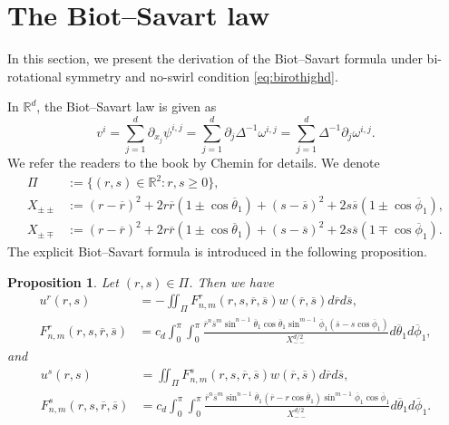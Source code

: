 \documentclass[11pt]{amsart}
\newtheorem{prop}[theorem]{Proposition}
\theoremstyle{definition}
\theoremstyle{remark}
\numberwithin{equation}{section}
\numberwithin{equation}{section}
\newcommand{\br}[1]{\overline{#1}}
\newcommand{\lap}{\Delta}
\newcommand{\rd}{\partial}
\newcommand{\0}{\emptyset}
\newcommand{\tht}{\theta}
\newcommand{\omg}{\omega}
\newcommand{\bbR}{\mathbb R}
\begin{document}
	
\section{The Biot--Savart law}\label{sec:BSlaw}
	
In this section, we present the derivation of the Biot--Savart formula under bi-rotational symmetry and no-swirl condition \eqref{eq:birothighd}. %
	
In $\bbR^{d}$, the Biot--Savart law is given as
\begin{equation}\label{eq:BSlawCartesian}
	v^{i}=\sum_{j=1}^{d}\rd_{x_{j}}\psi^{i,j}=\sum_{j=1}^{d}\rd_{j}\lap^{-1}\omg^{i,j}=\sum_{j=1}^{d}\lap^{-1}\rd_{j}\omg^{i,j}.
\end{equation}
We refer the readers to the book by Chemin \cite{Chemin} for details. We denote
\begin{equation}
\begin{aligned}
\Pi&:=\{(r,s)\in \bbR^{2} : r,s\geq0\},\\
X_{\pm\pm}&:=(r-\br{r})^{2}+2r\br{r}(1\pm\cos\br{\tht}_{1})+(s-\br{s})^{2}+2s\br{s}(1\pm\cos\br{\phi}_{1}),\\
X_{\pm\mp}&:=(r-\br{r})^{2}+2r\br{r}(1\pm\cos\br{\tht}_{1})+(s-\br{s})^{2}+2s\br{s}(1\mp\cos\br{\phi}_{1}).%
\end{aligned}
\end{equation}
The explicit Biot--Savart formula is introduced in the following proposition.
	\begin{prop}\label{prop:bsformula}
		Let $(r,s)\in \Pi $. Then we have
		\begin{align}
			u^{r}(r,s)&=-%
			\iint_{\Pi}F_{n,m}^{r}(r,s,\br{r},\br{s})w(\br{r},\br{s})
			d\br{r}d\br{s},\\
			F_{n,m}^{r}(r,s,\br{r},\br{s})&=c_{d}\int_{0}^{\pi}\int_{0}^{\pi}%
			\frac{\br{r}^{n}\br{s}^{m}\sin^{n-1}\br{\tht}_{1}\cos\br{\tht}_{1}\sin^{m-1}\br{\phi}_{1}(\br{s}-s\cos\br{\phi}_{1})}{X_{--}^{d/2}}d\br{\tht}_{1}%
			d\br{\phi}_{1},
		\end{align}
		and
		\begin{align}
			u^{s}(r,s)&=%
			\iint_{\Pi}F_{n,m}^{s}(r,s,\br{r},\br{s})w(\br{r},\br{s})%
			d\br{r}d\br{s},\\
			F_{n,m}^{s}(r,s,\br{r},\br{s})&=c_{d}\int_{0}^{\pi}\int_{0}^{\pi}%
			\frac{\br{r}^{n}\br{s}^{m}\sin^{n-1}\br{\tht}_{1}(\br{r}-r\cos\br{\tht}_{1})\sin^{m-1}\br{\phi}_{1}\cos\br{\phi}_{1}}{X_{--}^{d/2}}d\br{\tht}_{1}%
			d\br{\phi}_{1}.%
		\end{align}
	\end{prop}
\end{document}
